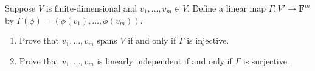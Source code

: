 \documentclass[10pt]{article}
\begin{document}
	\begin{problem}
		Suppose \( V \) is finite-dimensional and \( v_1, \dots, v_m \in V \). Define a linear map \( \Gamma
		: V' \to \mathbf{F}^{m} \) by \( \Gamma(\phi) = (\phi(v_1), \dots, \phi(v_m)) \). 
		\begin{enumerate}[label=(\alph*)]
			\item Prove that \( v_1, \dots, v_m \) spans \( V \) if and only if \( \Gamma \) is injective. 
			\item Prove that \( v_1, \dots, v_m \) is linearly independent if and only if \( \Gamma \) is
				surjective. 
		\end{enumerate}
	\end{problem}
\end{document}
